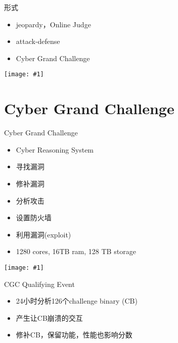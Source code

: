 \documentclass{beamer}
\newcommand{\image}[1]{
  \begin{frame}
    \texttt{[image: \#1]}
  \end{frame}
}
\begin{document}
\begin{frame}
  \begin{block}{形式}
    \begin{itemize}[<+-|alert@+>]
      \item jeopardy，Online Judge
      \item attack-defense
      \item Cyber Grand Challenge
    \end{itemize}
  \end{block}
\end{frame}

\image{img/bctf.jpg}

\section{Cyber Grand Challenge}

\begin{frame}
  \begin{block}{Cyber Grand Challenge}
    \begin{itemize}
      \item Cyber Reasoning System
      \item 寻找漏洞
      \item 修补漏洞
      \item 分析攻击
      \item 设置防火墙
      \item 利用漏洞(exploit)
      \item 1280 cores, 16TB ram, 128 TB storage
    \end{itemize}
  \end{block}
\end{frame}

\image{img/cgc-timeline.png}

\begin{frame}
  \begin{block}{CGC Qualifying Event}
    \begin{itemize}
      \item 24小时分析126个challenge binary (CB)
      \item 产生让CB崩溃的交互
      \item 修补CB，保留功能，性能也影响分数
    \end{itemize}
  \end{block}
\end{frame}
\end{document}
